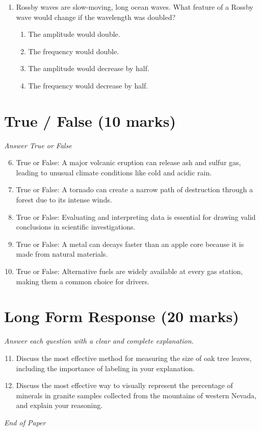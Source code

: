 \documentclass[12pt]{article}
\begin{document}
\begin{enumerate}[label=\arabic*.]
\begin{enumerate}[label=(\alph*)]
    \item The mass of water increased.
    \item The water took a definite shape.
    \item The flavor of the water changed.
\end{enumerate}
\item Rossby waves are slow-moving, long ocean waves. What feature of a Rossby wave would change if the wavelength was doubled?
\begin{enumerate}[label=(\alph*)]
    \item The amplitude would double.
    \item The frequency would double.
    \item The amplitude would decrease by half.
    \item The frequency would decrease by half.
\end{enumerate}
\end{enumerate}

\section*{True / False (10 marks)}
\textit{Answer True or False}
\begin{enumerate}[label=\arabic*.]
\setcounter{enumi}{5}
\item True or False: A major volcanic eruption can release ash and sulfur gas, leading to unusual climate conditions like cold and acidic rain.
\item True or False: A tornado can create a narrow path of destruction through a forest due to its intense winds.
\item True or False: Evaluating and interpreting data is essential for drawing valid conclusions in scientific investigations.
\item True or False: A metal can decays faster than an apple core because it is made from natural materials.
\item True or False: Alternative fuels are widely available at every gas station, making them a common choice for drivers.
\end{enumerate}

\section*{Long Form Response (20 marks)}
\textit{Answer each question with a clear and complete explanation.}
\begin{enumerate}[label=\arabic*.]
\setcounter{enumi}{10}
\item Discuss the most effective method for measuring the size of oak tree leaves, including the importance of labeling in your explanation.
\item Discuss the most effective way to visually represent the percentage of minerals in granite samples collected from the mountains of western Nevada, and explain your reasoning.
\end{enumerate}

\vfill
\noindent\textit{End of Paper}
\end{document}

